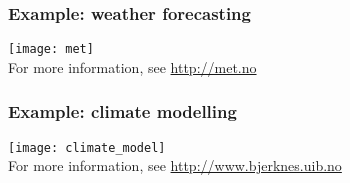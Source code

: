 \begin{frame}
  \frametitle{Example: weather forecasting}
  \begin{center}
    \texttt{[image: met]} \\
    For more information, see \url{http://met.no}
  \end{center}
\end{frame}

\begin{frame}
  \frametitle{Example: climate modelling}
  \begin{center}
    \texttt{[image: climate\_model]} \\
    For more information, see \url{http://www.bjerknes.uib.no}
  \end{center}
\end{frame}


